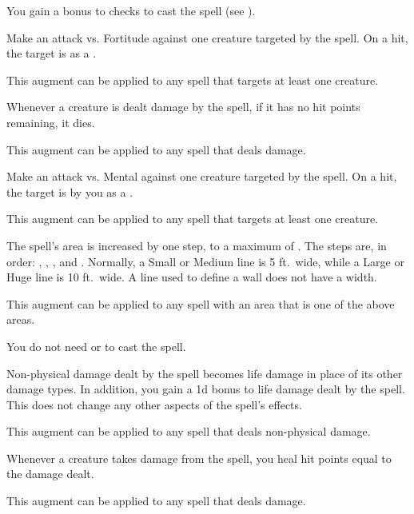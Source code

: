         {
             You gain a  bonus to  checks to cast the spell (see ).

             Make an attack vs. Fortitude against one creature targeted by the spell.
            On a hit, the target is  as a .
            \par This augment can be applied to any spell that targets at least one creature.

             Whenever a creature is dealt damage by the spell, if it has no hit points remaining, it dies.
            \par This augment can be applied to any spell that deals damage.

             Make an attack vs. Mental against one creature targeted by the spell.
            On a hit, the target is  by you as a .
            \par This augment can be applied to any spell that targets at least one creature.

             The spell's area is increased by one step, to a maximum of \areahuge.
            The steps are, in order: \areasmall, \areamed, \arealarge, and \areahuge.
            Normally, a Small or Medium line is 5 ft.\ wide, while a Large or Huge line is 10 ft.\ wide.
            A line used to define a wall does not have a width.
            \par This augment can be applied to any spell with an area that is one of the above areas.

             You do not need  or  to cast the spell.

             Non-physical damage dealt by the spell becomes life damage in place of its other damage types.
            In addition, you gain a \plus1d bonus to life damage dealt by the spell.
            This does not change any other aspects of the spell's effects.
            \par This augment can be applied to any spell that deals non-physical damage.

             Whenever a creature takes damage from the spell, you heal hit points equal to the damage dealt.
            \par This augment can be applied to any spell that deals damage.

}

